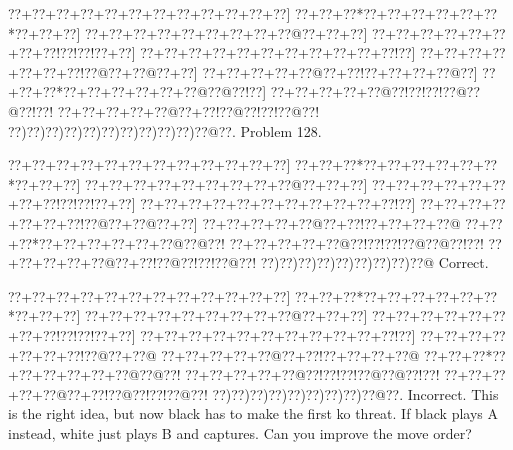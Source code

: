 \documentclass[a5paper]{article}
\begin{document}
\begin{center}
{\goo
\0??+\0??+\0??+\0??+\0??+\0??+\0??+\0??+\0??+\0??+\0??+\0??]
\0??+\0??+\0??*\0??+\0??+\0??+\0??+\0??+\0??*\0??+\0??+\0??]
\0??+\0??+\0??+\0??+\0??+\0??+\0??+\0??+\0??@\0??+\0??+\0??]
\0??+\0??+\0??+\0??+\0??+\0??+\0??+\0??!\0??!\0??!\0??+\0??]
\0??+\0??+\0??+\0??+\0??+\0??+\0??+\0??+\0??+\0??+\0??!\0??]
\0??+\0??+\0??+\0??+\0??+\0??+\0??!\0??@\0??+\0??@\0??+\0??]
\0??+\0??+\0??+\0??+\0??@\0??+\0??!\0??+\0??+\0??+\0??@\0??]
\0??+\0??+\0??*\0??+\0??+\0??+\0??+\0??+\0??@\0??@\0??!\0??]
\0??+\0??+\0??+\0??+\0??@\0??!\0??!\0??!\0??@\0??@\0??!\0??!
\0??+\0??+\0??+\0??+\0??@\0??+\0??!\0??@\0??!\0??!\0??@\0??!
\0??)\0??)\0??)\0??)\0??)\0??)\0??)\0??)\0??)\0??)\0??@\0??.
}
Problem 128.

\end{center}
\begin{center}
{\goo
\0??+\0??+\0??+\0??+\0??+\0??+\0??+\0??+\0??+\0??+\0??+\0??]
\0??+\0??+\0??*\0??+\0??+\0??+\0??+\0??+\0??*\0??+\0??+\0??]
\0??+\0??+\0??+\0??+\0??+\0??+\0??+\0??+\0??@\0??+\0??+\0??]
\0??+\0??+\0??+\0??+\0??+\0??+\0??+\0??!\0??!\0??!\0??+\0??]
\0??+\0??+\0??+\0??+\0??+\0??+\0??+\0??+\0??+\0??+\0??!\0??]
\0??+\0??+\0??+\0??+\0??+\0??+\0??!\0??@\0??+\0??@\0??+\0??]
\0??+\0??+\0??+\0??+\0??@\0??+\0??!\0??+\0??+\0??+\0??@
\0??+\0??+\0??*\0??+\0??+\0??+\0??+\0??+\0??@\0??@\0??!
\0??+\0??+\0??+\0??+\0??@\0??!\0??!\0??!\0??@\0??@\0??!\0??!
\0??+\0??+\0??+\0??+\0??@\0??+\0??!\0??@\0??!\0??!\0??@\0??!
\0??)\0??)\0??)\0??)\0??)\0??)\0??)\0??)\0??@
}
Correct. 

\end{center}
\begin{center}
{\goo
\0??+\0??+\0??+\0??+\0??+\0??+\0??+\0??+\0??+\0??+\0??+\0??]
\0??+\0??+\0??*\0??+\0??+\0??+\0??+\0??+\0??*\0??+\0??+\0??]
\0??+\0??+\0??+\0??+\0??+\0??+\0??+\0??+\0??@\0??+\0??+\0??]
\0??+\0??+\0??+\0??+\0??+\0??+\0??+\0??!\0??!\0??!\0??+\0??]
\0??+\0??+\0??+\0??+\0??+\0??+\0??+\0??+\0??+\0??+\0??!\0??]
\0??+\0??+\0??+\0??+\0??+\0??+\0??!\0??@\0??+\0??@
\0??+\0??+\0??+\0??+\0??@\0??+\0??!\0??+\0??+\0??+\0??@
\0??+\0??+\0??*\0??+\0??+\0??+\0??+\0??+\0??@\0??@\0??!
\0??+\0??+\0??+\0??+\0??@\0??!\0??!\0??!\0??@\0??@\0??!\0??!
\0??+\0??+\0??+\0??+\0??@\0??+\0??!\0??@\0??!\0??!\0??@\0??!
\0??)\0??)\0??)\0??)\0??)\0??)\0??)\0??)\0??@\0??.
}
Incorrect. This is the right idea, but now black has to make the first ko threat. If black plays A instead, white just plays B and captures. Can you improve the move order?

\end{center}
\end{document}
